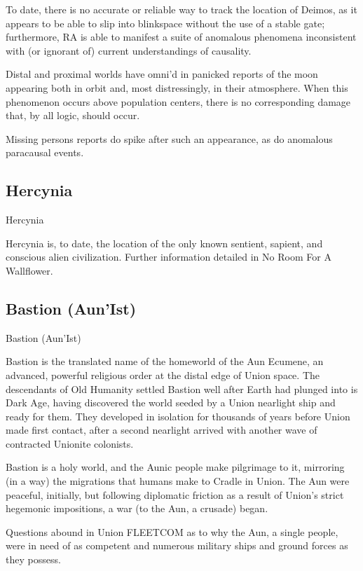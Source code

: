 To date, there is no accurate or reliable way to track the location of Deimos, as it appears to be  
able to slip into blinkspace without the use of a stable gate; furthermore, RA is able to manifest a  
suite of anomalous phenomena inconsistent with (or ignorant of) current understandings of  
causality.    
 

Distal and proximal worlds have omni’d in panicked reports of the moon appearing both in orbit  
and, most distressingly, in their atmosphere. When this phenomenon occurs above population  
centers, there is no corresponding damage that, by all logic, should occur.
 

Missing persons reports do spike after such an appearance, as do anomalous paracausal  
events. 
 

                                                                                                                  

\subsection{Hercynia}
Hercynia  

Hercynia is, to date, the location of the only known sentient, sapient, and conscious alien  
civilization. Further information detailed in No Room For A Wallflower.  
 
\subsection{Bastion (Aun’Ist)}
Bastion (Aun’Ist)  

Bastion is the translated name of the homeworld of the Aun Ecumene, an advanced, powerful  
religious order at the distal edge of Union space. The descendants of Old Humanity settled  
Bastion well after Earth had plunged into is Dark Age, having discovered the world seeded by a  
Union nearlight ship and ready for them. They developed in isolation for thousands of years  
before Union made first contact, after a second nearlight arrived with another wave of contracted  
Unionite colonists. 
 

Bastion is a holy world, and the Aunic people make pilgrimage to it, mirroring (in a way) the  
migrations that humans make to Cradle in Union. The Aun were peaceful, initially, but following  
diplomatic friction as a result of Union’s strict hegemonic impositions, a war (to the Aun, a  
crusade) began. 
 

Questions abound in Union FLEETCOM as to why the Aun, a single people, were in need of as  
competent and numerous military ships and ground forces as they possess.   
 
